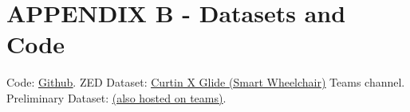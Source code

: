 \section*{APPENDIX B - Datasets and Code}


Code: \href{https://github.com/JakobWyatt/smart-wheelchair}{\underline{Github}}.
ZED Dataset: \href{https://curtin.sharepoint.com/:f:/r/sites/CurtinXGlide/Shared%20Documents/Navigation%20and%20Object%20Detection/ZED?csf=1&web=1&e=tTau9D}{\underline{Curtin X Glide (Smart Wheelchair)}} Teams channel.
Preliminary Dataset: \href{https://curtin.sharepoint.com/:v:/r/sites/CurtinXGlide/Shared%20Documents/Navigation%20and%20Object%20Detection/GoPro%20Dataset.mp4?csf=1&web=1&e=seLdRb}{\underline{(also hosted on teams)}}.
